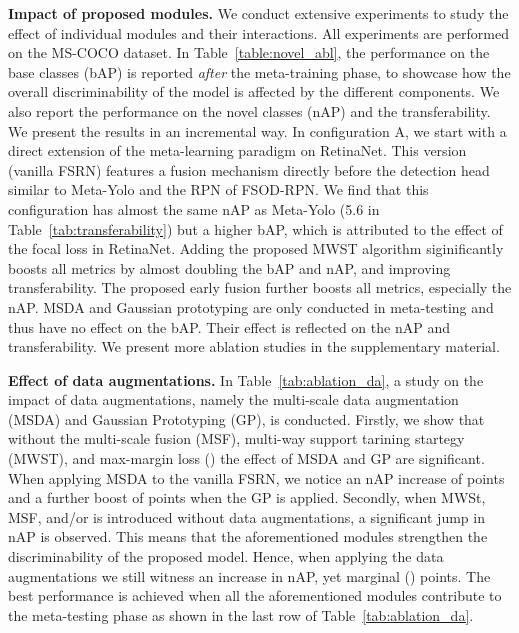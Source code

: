 \documentclass[10pt,twocolumn,letterpaper]{article}
\begin{document}
\textbf{Impact of proposed modules.} We conduct extensive experiments to study the effect of individual modules and their interactions. All experiments are performed on the MS-COCO dataset. In Table~\ref{table:novel_abl}, the performance on the base classes (bAP) is reported \textit{after} the meta-training phase, to showcase how the overall discriminability of the model is affected by the different components. We also report the performance on the novel classes (nAP) and the transferability. We present the results in an incremental way. In configuration A, we start with a direct extension of the meta-learning paradigm on RetinaNet. This version (vanilla FSRN) features a fusion mechanism directly before the detection head similar to Meta-Yolo and the RPN of FSOD-RPN. We find that this configuration has almost the same nAP as Meta-Yolo (5.6 in Table~\ref{tab:transferability}) but a higher bAP, which is attributed to the effect of the focal loss in RetinaNet. Adding the proposed MWST algorithm siginificantly boosts all metrics by almost doubling the bAP and nAP, and improving transferability. The proposed early fusion further boosts all metrics, especially the nAP. MSDA and Gaussian prototyping are only conducted in meta-testing and thus have no effect on the bAP. Their effect is reflected on the nAP and transferability. We present more ablation studies in the supplementary material.

\textbf{Effect of data augmentations.} In Table~\ref{tab:ablation_da}, a study on the impact of data augmentations, namely the multi-scale data augmentation (MSDA) and Gaussian Prototyping (GP), is conducted. Firstly, we show that without the multi-scale fusion (MSF), multi-way support tarining startegy (MWST), and max-margin loss () the effect of MSDA and GP are significant. When applying MSDA to the vanilla FSRN, we notice an nAP increase of  points and a further boost of  points when the GP is applied. Secondly, when MWSt, MSF, and/or  is introduced without data augmentations, a significant jump in nAP is observed. This means that the aforementioned modules strengthen the discriminability of the proposed model. Hence, when applying the data augmentations we still witness an increase in nAP, yet marginal () points. The best performance is achieved when all the aforementioned modules contribute to the meta-testing phase as shown in the last row of Table~\ref{tab:ablation_da}. 
\end{document}
